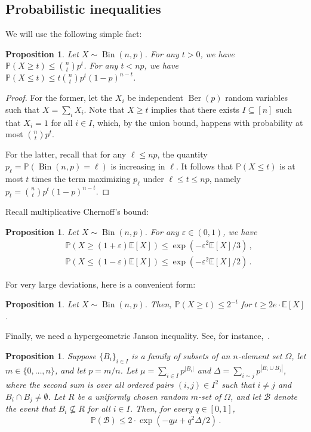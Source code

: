 \documentclass[reqno,final,a4paper]{amsart}
\numberwithin{equation}{section}
\newtheorem{proposition}[theorem]{Proposition}
\theoremstyle{definition}
\theoremstyle{remark}
\renewcommand{\Pr}{\mathbb{P}}
\newcommand{\E}{\mathbb{E}}
\newcommand{\eps}{\varepsilon}
\newcommand{\Ber}{\operatorname{Ber}}
\newcommand{\Bin}{\operatorname{Bin}}
\def\calB{\mathcal{B}}
\begin{document}
\subsection{Probabilistic inequalities}
We will use the following simple fact:
\begin{proposition}\label{prop:basic-inequality}
    Let $X\sim \Bin(n,p)$. For any $t > 0$, we have $\Pr(X\geq t)\leq \binom{n}{t}p^t$. For any $t< np$, we have $\Pr(X\leq t)\leq t\binom{n}{t}p^t(1-p)^{n-t}$.
\end{proposition}
\begin{proof}
    For the former, let the $X_i$ be independent $\Ber(p)$ random variables such that $X = \sum_i X_i$.
    Note that $X\geq t$ implies that there exists $I\subseteq [n]$ such that $X_i = 1$ for all $i\in I$, which, by the union bound, happens with probability at most $\binom{n}{t}p^t$.
    
    For the latter, recall that for any $\ell \leq np$, the quantity $p_\ell = \Pr(\Bin(n,p) = \ell)$ is increasing in $\ell$. It follows that $\Pr(X\leq t)$ is at most $t$ times the term maximizing $p_\ell$ under $\ell\leq t\leq np$, namely $p_t = \binom{n}{t}p^t(1-p)^{n-t}$.
\end{proof}
Recall multiplicative Chernoff's bound:
\begin{proposition}\label{prop:chernoff}
    Let $X\sim \Bin(n,p)$. For any $\eps\in (0,1)$, we have 
    \begin{align*}
        &\Pr(X\geq (1+\eps)\E[X]) \leq \exp(-\eps^2\E[X]/3)\,,\\
        &\Pr(X\leq (1-\eps)\E[X]) \leq \exp(-\eps^2\E[X]/2)\,.
    \end{align*}
\end{proposition}
For very large deviations, here is a convenient form:
\begin{proposition}\label{prop:chernoff-large}
    Let $X\sim \Bin(n,p)$. Then, $\Pr(X\geq t)\leq 2^{-t}$ for $t\geq 2e\cdot \E[X]$.
\end{proposition}
Finally, we need a hypergeometric Janson inequality. See, for instance,~\cite[Lemma 3.1]{Balogh-Morris-Samotij-Warnke}.
\begin{proposition}\label{prop:janson}
    Suppose $\{B_i\}_{i\in I}$ is a family of subsets of an $n$-element set $\Omega$, let $m\in \{0,\dots, n\}$, and let $p = m/n$. Let $\mu = \sum_{i\in I}p^{|B_i|}$ and $\Delta = \sum_{i\sim j} p^{|B_i\cup B_j|}$, where the second sum is over all ordered pairs $(i,j)\in I^2$ such that $i\neq j$ and $B_i\cap B_j \neq \emptyset$. 
    Let $R$ be a uniformly chosen random $m$-set of $\Omega$, and let $\calB$ denote the event that $B_i\nsubseteq R$ for all $i\in I$. Then, for every $q\in [0,1]$, 
    \[
        \Pr(\calB)\leq 2\cdot \exp(-q\mu + q^2\Delta/2)\,.
    \]
\end{proposition}
\end{document}
